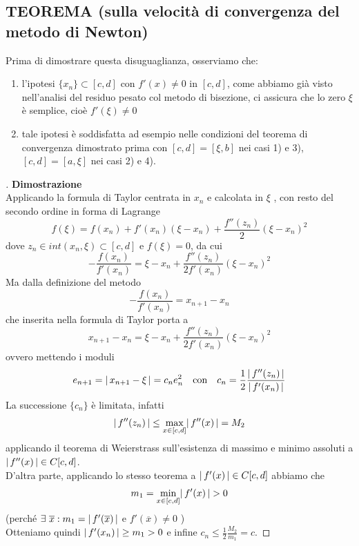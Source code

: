 \subsection{TEOREMA (sulla velocità di convergenza del metodo di Newton)}
\begin{center}
\end{center}
Prima di dimostrare questa disuguaglianza, osserviamo che:
\begin{enumerate}[label=\roman*)]
\item l'ipotesi $\{x_n\} \subset [c,d]$ con $f'(x)\neq0$ in $[c,d]$, come abbiamo già visto nell'analisi del residuo pesato col metodo di bisezione, ci assicura che lo zero $\xi$ è semplice, cioè $f'(\xi) \neq 0$

\item tale ipotesi è soddisfatta ad esempio nelle condizioni del teorema di convergenza dimostrato prima con $[c,d] = [\xi, b]$ nei casi 1) e 3), $[c,d] = [a,\xi]$ nei casi 2) e 4).
\end{enumerate}

\begin{proof}[\unskip\nopunct]
\textbf{Dimostrazione}\\
Applicando la formula di Taylor centrata in $x_n$ e calcolata in $\xi $ , con resto del secondo ordine in forma di Lagrange
\[f(\xi)=f(x_n)+f'(x_n)(\xi-x_n)+\frac{f''(z_n)}{2}(\xi-x_n)^2\]
dove $z_n\in int(x_n,\xi)\subset [c,d]$ e $f(\xi)=0$, da cui 
\[-\frac{f(x_n)}{f'(x_n)}=\xi-x_n+\frac{f''(z_n)}{2f'(x_n)}(\xi-x_n)^2\]
Ma dalla definizione del metodo
\[-\frac{f(x_n)}{f'(x_n)}=x_{n+1}-x_n\]
che inserita nella formula di Taylor porta a 
\[x_{n+1}-x_n=\xi-x_n+\frac{f''(z_n)}{2f'(x_n)}(\xi-x_n)^2\]
ovvero mettendo i moduli
\[e_{n+1}=\lvert\,x_{n+1}-\xi\,\rvert=c_ne_n^2 \quad \text{con} \quad c_n=\frac{1}{2}\frac{\lvert\,f''(z_n)\,\rvert}{\lvert\,f'(x_n)\,\rvert}\]
La successione $\{c_n\}$ è limitata, infatti 
\[\lvert\,f''(z_n)\,\rvert\leq \max_{x \in [c,d]}\lvert\,f''(x)\,\rvert=M_2\]
applicando il teorema di Weierstrass sull'esistenza di massimo e minimo assoluti a $ \lvert\,f''(x)\,\rvert\in C[c,d]$.\\
D'altra parte, applicando lo stesso teorema a  $ \lvert\,f'(x)\,\rvert\in C[c,d]$ abbiamo che 
\[m_1=\min_{x \in [c,d]}\lvert\,f'(x)\,\rvert>0\] 
(perché $\exists \ \overline{x}: m_1=\lvert\,f'(\overline{x})\,\rvert $  e    $f'(\overline{x})\neq 0$   )\\
Otteniamo quindi $\lvert\,f'(x_n)\,\rvert\geq m_1>0$ e infine $c_n \leq \frac{1}{2}\frac{M_2}{m_1}=c$. 
\newline 
\end{proof}

